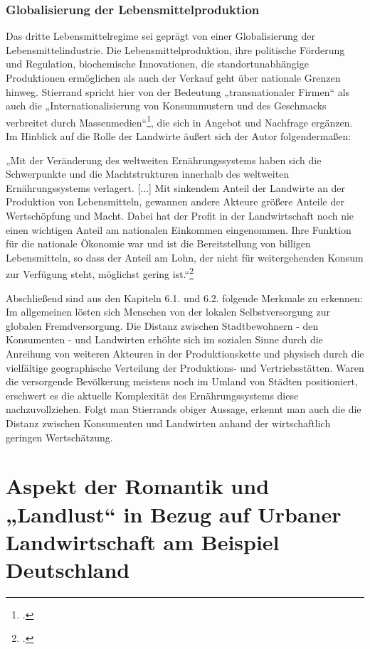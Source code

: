 \documentclass{scrartcl}
\begin{document}
\subsubsection*{Globalisierung der Lebensmittelproduktion}
Das dritte Lebensmittelregime sei geprägt von einer Globalisierung der Lebensmittelindustrie. Die Lebensmittelproduktion, ihre politische Förderung und Regulation, biochemische Innovationen, die standortunabhängige Produktionen ermöglichen als auch der Verkauf geht über nationale Grenzen hinweg. Stierrand spricht hier von der Bedeutung „transnationaler Firmen“ als auch die „Internationalisierung von Konsummustern und des Geschmacks verbreitet durch Massenmedien“\footcites[Vgl.][S.24ff]{Stierand2008StadtLebensmittel}, die sich in Angebot und Nachfrage ergänzen. Im Hinblick auf die Rolle der Landwirte äußert sich der Autor folgendermaßen:
\begin{displayquote}
„Mit der Veränderung des weltweiten Ernährungssystems haben sich die Schwerpunkte und die Machtstrukturen innerhalb des weltweiten Ernährungssystems verlagert. [...] Mit sinkendem Anteil der Landwirte an der Produktion von Lebensmitteln, gewannen andere Akteure größere Anteile der Wertschöpfung und Macht. Dabei hat der Profit in der Landwirtschaft noch nie einen wichtigen Anteil am nationalen Einkommen eingenommen. Ihre Funktion für die nationale Ökonomie war und ist die Bereitstellung von billigen Lebensmitteln, so dass der Anteil am Lohn, der nicht für weitergehenden Konsum zur Verfügung steht, möglichst gering ist.“\footcite[S.25]{Stierand2008StadtLebensmittel}
\end{displayquote}

Abschließend sind aus den Kapiteln 6.1. und 6.2. folgende Merkmale zu erkennen: Im allgemeinen lösten sich Menschen von der lokalen Selbstversorgung zur globalen Fremdversorgung. Die Distanz zwischen Stadtbewohnern - den Konsumenten - und Landwirten erhöhte sich im sozialen Sinne durch die Anreihung von weiteren Akteuren in der Produktionskette und physisch durch die vielfältige geographische Verteilung der Produktions- und Vertriebsstätten. Waren die versorgende Bevölkerung meistens noch im Umland von Städten positioniert, erschwert es die aktuelle Komplexität des Ernährungssystems diese nachzuvollziehen. Folgt man Stierrands obiger Aussage, erkennt man auch die die Distanz zwischen Konsumenten und Landwirten anhand der wirtschaftlich geringen Wertschätzung. 


\section{Aspekt der Romantik und „Landlust“ in Bezug auf Urbaner Landwirtschaft am Beispiel Deutschland}
\end{document}
